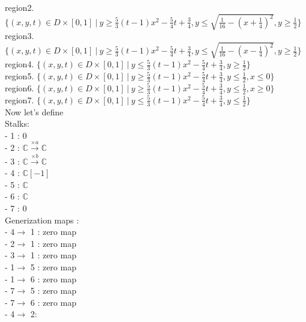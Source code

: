 region2. $\{(x,y,t)\in D\times [0,1]~|~y \geq \frac{5}{3}(t-1)x^2 - \frac{5}{4}t + \frac{3}{4}, y \leq \sqrt{\frac{1}{16}-(x+\frac{1}{4})^2}, y\geq \frac{1}{2} \}$\\

region3. $\{(x,y,t)\in D\times [0,1]~|~y \geq \frac{5}{3}(t-1)x^2 - \frac{5}{4}t + \frac{3}{4}, y \leq \sqrt{\frac{1}{16}-(x-\frac{1}{4})^2}, y\geq \frac{1}{2} \}$\\

region4. $\{(x,y,t)\in D\times [0,1]~|~y \leq \frac{5}{3}(t-1)x^2 - \frac{5}{4}t + \frac{3}{4}, y\geq \frac{1}{2} \}$\\

region5. $\{(x,y,t)\in D\times [0,1]~|~y \geq \frac{5}{3}(t-1)x^2 - \frac{5}{4}t + \frac{3}{4},  y\leq \frac{1}{2}, x\leq 0 \}$\\

region6. $\{(x,y,t)\in D\times [0,1]~|~y \geq \frac{5}{3}(t-1)x^2 - \frac{5}{4}t + \frac{3}{4},  y\leq \frac{1}{2}, x\geq 0 \}$\\

region7. $\{(x,y,t)\in D\times [0,1]~|~y \leq \frac{5}{3}(t-1)x^2 - \frac{5}{4}t + \frac{3}{4},  y\leq \frac{1}{2} \}$\\

Now let's define \\

Stalks:\\

- 1 : 0\\
- 2 : $\mathbb{C}\xrightarrow{\times a}\mathbb{C}$\\
- 3 : $\mathbb{C}\xrightarrow{\times b}\mathbb{C}$\\
- 4 : $\mathbb{C}[-1]$ \\
- 5 : $\mathbb{C}$\\
- 6 : $\mathbb{C}$\\
- 7 : 0\\ 


Generization maps :\\
- 4$\rightarrow$ 1 : zero map \\
- 2$\rightarrow$ 1 : zero map \\
- 3$\rightarrow$ 1 : zero map \\
- 1$\rightarrow$ 5 : zero map \\
- 1$\rightarrow$ 6 : zero map \\
- 7$\rightarrow$ 5 : zero map \\
- 7$\rightarrow$ 6 : zero map \\
- 4$\rightarrow$ 2: 

